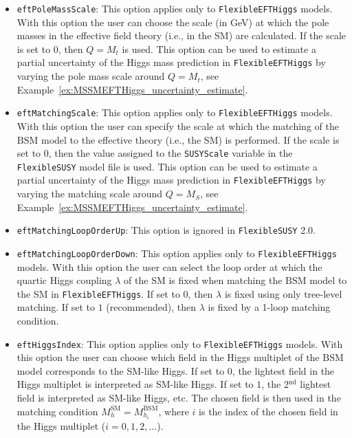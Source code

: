 \documentclass[final,3p,11pt,pdflatex]{elsarticle}
\makeatletter
\newcommand{\fs}{\texttt{FlexibleSUSY}\@\xspace}
\newcommand{\fstwo}{\fs 2.0\@\xspace}
\newcommand{\feft}{\texttt{Flex\-ib\-le\-EFT\-Higgs}\@\xspace}
\newcommand{\code}[1]{\lstinline|#1|}  %
\newcommand{\SM}{\ensuremath{\text{SM}}\xspace}
\newcommand{\BSM}{\ensuremath{\text{BSM}}\xspace}
\newcommand{\MS}{\ensuremath{M_S}\xspace}
\newcommand{\exref}[1]{Example~\ref{#1}}
\makeatother
\begin{document}
\begin{itemize}
\item[\texttt{FlexibleSUSY[18]},] \texttt{eftPoleMassScale}: This
  option applies only to \feft models.  With this option the user can
  choose the scale (in GeV) at which the pole masses in the effective
  field theory (i.e., in the SM) are calculated.  If the
  scale is set to $0$, then $Q = M_t$ is used.  This option can be
  used to estimate a partial uncertainty of the Higgs mass
  prediction in \feft by varying the pole mass scale around $Q = M_t$,
  see \exref{ex:MSSMEFTHiggs_uncertainty_estimate}.

\item[\texttt{FlexibleSUSY[19]},] \texttt{eftMatchingScale}: This
  option applies only to \feft models.  With this option the user can
  specify the scale at which the matching of the \BSM model to the
  effective theory (i.e., the SM) is performed.  If the
  scale is set to $0$, then the value assigned to the \code{SUSYScale}
  variable in the \fs model file is used.  This option can be used to
  estimate a partial uncertainty of the Higgs mass prediction
  in \feft by varying the matching scale around $Q = \MS$, see
  \exref{ex:MSSMEFTHiggs_uncertainty_estimate}.

\item[\texttt{FlexibleSUSY[20]},] \texttt{eftMatchingLoopOrderUp}:
  This option is ignored in \fstwo.

\item[\texttt{FlexibleSUSY[21]},] \texttt{eftMatchingLoopOrderDown}:
  This option applies only to \feft models.  With this option the user
  can select the loop order at which the quartic Higgs coupling
  $\lambda$ of the SM is fixed when matching the \BSM
  model to the SM in \feft.  If set to $0$, then $\lambda$
  is fixed using only tree-level matching.  If set to $1$
  (recommended), then $\lambda$ is fixed by a 1-loop matching
  condition.

\item[\texttt{FlexibleSUSY[22]},] \texttt{eftHiggsIndex}: This option
  applies only to \feft models.  With this option the user can choose
  which field in the Higgs multiplet of the \BSM model corresponds to
  the SM-like Higgs.  If set to $0$, the lightest field in the Higgs
  multiplet is interpreted as SM-like Higgs.  If set to $1$, the
  2$^{\text{nd}}$ lightest field is interpreted as SM-like Higgs, etc.
  The chosen field is then used in the matching condition
  $M_h^{\SM} = M_{h_i}^{\BSM}$, where $i$ is the index of the chosen
  field in the Higgs multiplet ($i=0,1,2,\ldots$).


\end{itemize}
\end{document}
